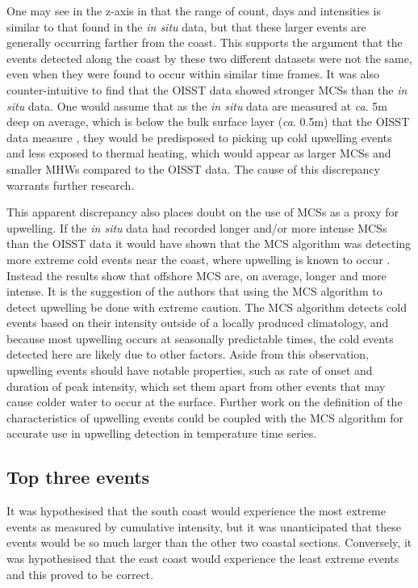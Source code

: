 \documentclass[a4paper,10pt,review]{elsarticle}
\begin{document}
One may see in the z-axis in  that the range of count, days and intensities is similar to that found in the \emph{in situ} data, but that these larger events are generally occurring farther from the coast. This supports the argument that the events detected along the coast by these two different datasets were not the same, even when they were found to occur within similar time frames. It was also counter-intuitive to find that the OISST data showed stronger MCSs than the \emph{in situ} data. One would assume that as the \emph{in situ} data are measured at \emph{ca}. 5m deep on average, which is below the bulk surface layer (\emph{ca}. 0.5m) that the OISST data measure \citep{Reynolds2002}, they would be predisposed to picking up cold upwelling events and less exposed to thermal heating, which would appear as larger MCSs and smaller MHWs compared to the OISST data. The cause of this discrepancy warrants further research.

This apparent discrepancy also places doubt on the use of MCSs as a proxy for upwelling. If the \emph{in situ} data had recorded longer and/or more intense MCSs than the OISST data it would have shown that the MCS algorithm was detecting more extreme cold events near the coast, where upwelling is known to occur \citep{Lutjeharms2000, Hutchings2009}. Instead the results show that offshore MCS are, on average, longer and more intense. It is the suggestion of the authors that using the MCS algorithm to detect upwelling be done with extreme caution. The MCS algorithm detects cold events based on their intensity outside of a locally produced climatology, and because most upwelling occurs at seasonally predictable times, the cold events detected here are likely due to other factors. Aside from this observation, upwelling events should have notable properties, such as rate of onset and duration of peak intensity, which set them apart from other events that may cause colder water to occur at the surface. Further work on the definition of the characteristics of upwelling events could be coupled with the MCS algorithm for accurate use in upwelling detection in temperature time series.

\subsection{Top three events}
It was hypothesised that the south coast would experience the most extreme events as measured by cumulative intensity, but it was unanticipated that these events would be so much larger than the other two coastal sections. Conversely, it was hypothesised that the east coast would experience the least extreme events and this proved to be correct.
\end{document}
